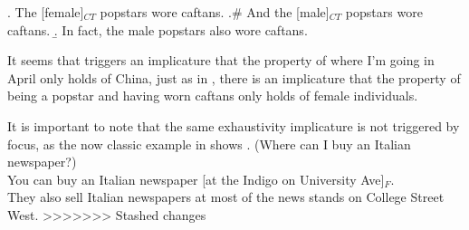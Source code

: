 \documentclass[GPFinal]{subfiles}
\begin{document}
\ex. The [female]$_{CT}$ popstars wore caftans.
\a.\# And the [male]$_{CT}$ popstars wore caftans.
\b. In fact, the male popstars also wore caftans.

It seems that \LLast triggers an implicature that the property of where I'm going in April only holds of China, just as in \Last, there is an implicature that the property of being a popstar and having worn caftans only holds of female individuals.

It is important to note that the same exhaustivity implicature is not triggered by focus, as the now classic example in \Next shows
\ex. (Where can I buy an Italian newspaper?)\\
You can buy an Italian newspaper [at the Indigo on University Ave]$_F$.\\
They also sell Italian newspapers at most of the news stands on College Street West.
>>>>>>> Stashed changes
\end{document}

